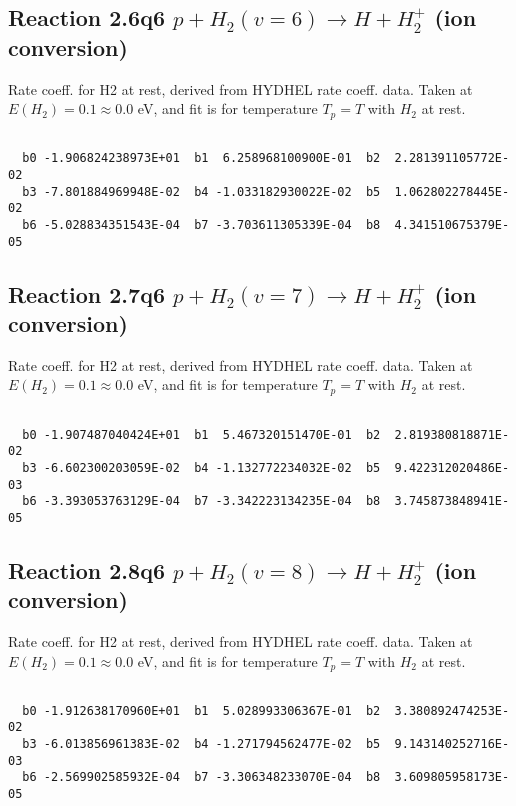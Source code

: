 \newpage
\subsection{
Reaction 2.6q6
$ p + H_2(v=6) \rightarrow H + H_2^+$ (ion conversion)
}
Rate coeff. for H2 at rest, derived from HYDHEL rate coeff. data.
Taken at $E(H_2) = 0.1 \approx 0.0$ eV,  and fit is for temperature $T_p=T$ with $H_2$ at rest.

\begin{small}\begin{verbatim}

  b0 -1.906824238973E+01  b1  6.258968100900E-01  b2  2.281391105772E-02
  b3 -7.801884969948E-02  b4 -1.033182930022E-02  b5  1.062802278445E-02
  b6 -5.028834351543E-04  b7 -3.703611305339E-04  b8  4.341510675379E-05

\end{verbatim}\end{small}

\newpage
\subsection{
Reaction 2.7q6
$ p + H_2(v=7) \rightarrow H + H_2^+$ (ion conversion)
}
Rate coeff. for H2 at rest, derived from HYDHEL rate coeff. data.
Taken at $E(H_2) = 0.1 \approx 0.0$ eV,  and fit is for temperature $T_p=T$ with $H_2$ at rest.

\begin{small}\begin{verbatim}

  b0 -1.907487040424E+01  b1  5.467320151470E-01  b2  2.819380818871E-02
  b3 -6.602300203059E-02  b4 -1.132772234032E-02  b5  9.422312020486E-03
  b6 -3.393053763129E-04  b7 -3.342223134235E-04  b8  3.745873848941E-05

\end{verbatim}\end{small}

\newpage
\subsection{
Reaction 2.8q6
$ p + H_2(v=8) \rightarrow H + H_2^+$ (ion conversion)
}
Rate coeff. for H2 at rest, derived from HYDHEL rate coeff. data.
Taken at $E(H_2) = 0.1 \approx 0.0$ eV,  and fit is for temperature $T_p=T$ with $H_2$ at rest.

\begin{small}\begin{verbatim}

  b0 -1.912638170960E+01  b1  5.028993306367E-01  b2  3.380892474253E-02
  b3 -6.013856961383E-02  b4 -1.271794562477E-02  b5  9.143140252716E-03
  b6 -2.569902585932E-04  b7 -3.306348233070E-04  b8  3.609805958173E-05

\end{verbatim}\end{small}

